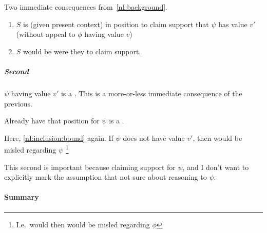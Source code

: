 \begin{note}
  Two immediate consequences from~\ref{nI:background}.
  \begin{enumerate}
  \item \(S\) is (given present context) in position to claim support that \(\psi\) has value \(v'\) (without appeal to \(\phi\) having value \(v\))
  \item \(S\) would be \nmom{} were they to claim support.
  \end{enumerate}
\end{note}

\subparagraph{Second \requ{}}

\begin{note}
  \(\psi\) having value \(v'\) is a \requ{}.
  This is a more-or-less immediate consequence of the previous.

  Already have that position for \(\psi\) is a \requ{}.

  Here, \autoref{nI:inclusion:bound} again.
  If \(\psi\) does not have value \(v'\), then would be misled regarding \(\psi\)\nolinebreak
  \footnote{I.e.\ would then would be misled regarding \(\phi\)}

  {
    \color{red} This second \requ{} is important because claiming support for \(\psi\), and I don't want to explicitly mark the assumption that not sure about reasoning to \(\psi\).
  }
\end{note}

\paragraph{Summary}

